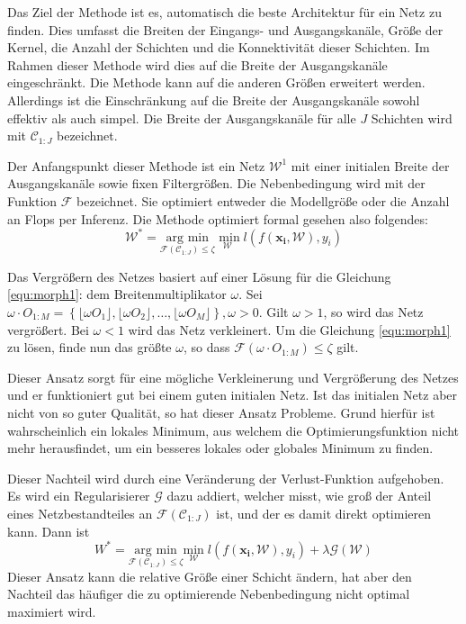 Das Ziel der Methode ist es, automatisch die beste Architektur für ein Netz zu finden. Dies umfasst die Breiten der Eingangs- und Ausgangskanäle, Größe der Kernel, die Anzahl der Schichten und die Konnektivität dieser Schichten. Im Rahmen dieser Methode wird dies auf die Breite der Ausgangskanäle eingeschränkt. Die Methode kann auf die anderen Größen erweitert werden. Allerdings ist die Einschränkung auf die Breite der Ausgangskanäle sowohl effektiv als auch simpel.
Die Breite der Ausgangskanäle für alle $J$ Schichten wird mit $\mathcal{C}_{1:J}$ bezeichnet. 

Der Anfangspunkt dieser Methode ist ein Netz $\mathcal{W}^1$ mit einer initialen Breite der Ausgangskanäle sowie fixen Filtergrößen. Die Nebenbedingung wird mit der Funktion $\mathcal{F}$ bezeichnet. Sie optimiert entweder die Modellgröße oder die Anzahl an Flops per Inferenz. Die Methode optimiert formal gesehen also folgendes:
\begin{equation}
 \mathcal{W}^{\ast}= \underset{\mathcal{F}(\mathcal{C}_{1:J})\leq \zeta}{\text{arg min}} \underset{\mathcal{W}}{\text{ min}}\; l(f(\mathbf{x_i}, \mathcal{W}),y_i)\label{equ:morph1}
\end{equation}

Das Vergrößern des Netzes basiert auf einer Lösung für die Gleichung \ref{equ:morph1}: dem Breitenmultiplikator $\omega$. 
Sei $\omega \cdot O_{1:M} = \left\{ \lfloor \omega O_1 \rfloor, \lfloor \omega O_2 \rfloor, \ldots , \lfloor \omega O_M \rfloor \right\}, \omega>0$. Gilt $\omega>1$, so wird das Netz vergrößert. Bei $\omega <1$ wird das Netz verkleinert. Um die Gleichung \ref{equ:morph1} zu lösen, finde nun das größte $\omega$, so dass $\mathcal{F}(\omega \cdot O_{1:M})\leq \zeta$ gilt.


Dieser Ansatz sorgt für eine mögliche Verkleinerung und Vergrößerung des Netzes und er funktioniert gut bei einem guten initialen Netz. Ist das initialen Netz aber nicht von so guter Qualität, so hat dieser Ansatz Probleme. Grund hierfür ist wahrscheinlich ein lokales Minimum, aus welchem die Optimierungsfunktion nicht mehr herausfindet, um ein besseres lokales oder globales Minimum zu finden.

Dieser Nachteil wird durch eine Veränderung der Verlust-Funktion aufgehoben. Es wird ein Regularisierer $\mathcal{G}$ dazu addiert, welcher misst, wie groß der Anteil eines Netzbestandteiles an $\mathcal{F}( \mathcal{C}_{1:J})$ ist, und der es damit direkt optimieren kann. Dann ist
\begin{equation}
 W^{\ast}= \underset{\mathcal{F}(\mathcal{C}_{1:J})\leq \zeta}{\text{arg min}} \underset{\mathcal{W}}{\text{min}}\; l(f(\mathbf{x_i}, \mathcal{W}),y_i) + \lambda \mathcal{G}( \mathcal{W})  
 \label{equ:morph2}
\end{equation}
Dieser Ansatz kann die relative Größe einer Schicht ändern, hat aber den Nachteil das häufiger die zu optimierende Nebenbedingung nicht optimal maximiert wird.


